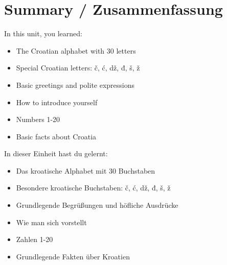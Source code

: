 \section{Summary / Zusammenfassung}

In this unit, you learned:
\begin{itemize}
    \item The Croatian alphabet with 30 letters
    \item Special Croatian letters: č, ć, dž, đ, š, ž
    \item Basic greetings and polite expressions
    \item How to introduce yourself
    \item Numbers 1-20
    \item Basic facts about Croatia
\end{itemize}

In dieser Einheit hast du gelernt:
\begin{itemize}
    \item Das kroatische Alphabet mit 30 Buchstaben
    \item Besondere kroatische Buchstaben: č, ć, dž, đ, š, ž
    \item Grundlegende Begrüßungen und höfliche Ausdrücke
    \item Wie man sich vorstellt
    \item Zahlen 1-20
    \item Grundlegende Fakten über Kroatien
\end{itemize}
